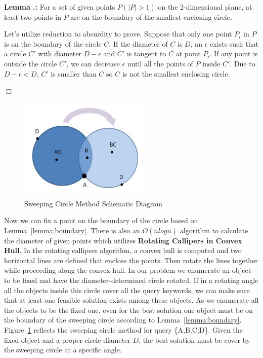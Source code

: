 \documentclass{sig-alternate}
\newcounter{theorem}[section]
\renewcommand{\thetheorem}{\nthesection.\arabic{theorem}}
\newenvironment{lemma}{\begin{em}
    \refstepcounter{theorem}
    {\vspace{1ex} \noindent\bf  Lemma  \thetheorem:}}{
    \end{em}\eop\vspace{1ex}} %
\newcommand{\nthesection}{\arabic{section}}
\newcommand{\eop}{\hspace*{\fill}\mbox{$\Box$}}
\begin{document}
\begin{lemma}\label{lemma:boundary}
For a set of given points $P(|P|>1)$ on the 2-dimensional plane,
at least two points in $P$ are on the boundary of the smallest enclosing circle.

\proof
Let's utilize reduction to absurdity to prove. Suppose that only one point 
$P_i$ in $P$ is on the boundary of the circle $C$. If the diameter of $C$
is $D$, an $\epsilon$ exists such that a circle $C'$ with diameter $D-\epsilon$
and $C'$ is tangent to $C$ at point $P_i$. If any point is outside the
circle $C'$, we can decrease $\epsilon$ until all the points of $P$ inside
$C'$. Due to $D-\epsilon < D$, $C'$ is smaller than $C$ so $C$ is not
the smallest enclosing circle.
\end{lemma}

\begin{figure}\label{fig:4}
\begin{center}
\includegraphics[width=2.5in]{figure/fig4}
\caption{Sweeping Circle Method Schematic Diagram}
\end{center}
\end{figure}

Now we can fix a point on the boundary of the circle based on Lemma~\ref{lemma:boundary}.
There is also an $O(nlogn)$ algorithm to calculate the diameter of given points 
which utilizes \textbf{Rotating Callipers in Convex Hull}. In the rotating callipers
algorithm, a convex hull is computed and two horizontal lines are defined
that enclose the points. Then rotate the lines together while proceeding along the
convex hull. In our problem we enumerate an object to be fixed and have the
diameter-determined circle rotated. If in a rotating angle all the objects inside
this circle cover all the query keywords, we can make sure that at least one feasible solution
exists among these objects. As we enumerate all the objects to be the fixed
one, even for the best solution one object must be on the boundary of the sweeping circle
according to Lemma~\ref{lemma:boundary}. Figure~\ref{fig:4} reflects the sweeping circle method
for query \{A,B,C,D\}.
Given the fixed object and a proper circle diameter $D$,
the best solution must be cover by the sweeping circle at a specific angle.
%
\end{document}
